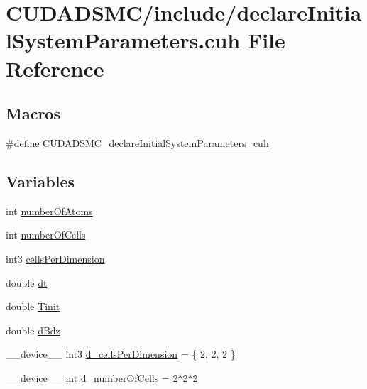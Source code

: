 \hypertarget{declare_initial_system_parameters_8cuh}{\section{C\+U\+D\+A\+D\+S\+M\+C/include/declare\+Initial\+System\+Parameters.cuh File Reference}
\label{declare_initial_system_parameters_8cuh}
}
\subsection*{Macros}
\begin{DoxyCompactItemize}
\item 
\#define \hyperlink{declare_initial_system_parameters_8cuh_add592058011313c15f4531093618f369}{C\+U\+D\+A\+D\+S\+M\+C\+\_\+declare\+Initial\+System\+Parameters\+\_\+cuh}
\end{DoxyCompactItemize}
\subsection*{Variables}
\begin{DoxyCompactItemize}
\item 
int \hyperlink{declare_initial_system_parameters_8cuh_a5ce690e43012981ef3034cbf0c746489}{number\+Of\+Atoms}
\item 
int \hyperlink{declare_initial_system_parameters_8cuh_ae88ac292f19dd72c295602c5dbb17bd6}{number\+Of\+Cells}
\item 
int3 \hyperlink{declare_initial_system_parameters_8cuh_af9f9488dcc4649cd47838407efec5dbe}{cells\+Per\+Dimension}
\item 
double \hyperlink{declare_initial_system_parameters_8cuh_a03e28be41881b703c836edbfe9b51b17}{dt}
\item 
double \hyperlink{declare_initial_system_parameters_8cuh_a321f450cd54ae9c0d795e718297adbf9}{Tinit}
\item 
double \hyperlink{declare_initial_system_parameters_8cuh_a25fc2a358206c74d3dfd41c48d05bb9d}{d\+Bdz}
\item 
\+\_\+\+\_\+device\+\_\+\+\_\+ int3 \hyperlink{declare_initial_system_parameters_8cuh_a270ca3126ecceeb4d2c2ac269538ce5f}{d\+\_\+cells\+Per\+Dimension} = \{ 2, 2, 2 \}
\item 
\+\_\+\+\_\+device\+\_\+\+\_\+ int \hyperlink{declare_initial_system_parameters_8cuh_a0527fa46022a946a4c0c7273a9d77839}{d\+\_\+number\+Of\+Cells} = 2$\ast$2$\ast$2
\end{DoxyCompactItemize}


